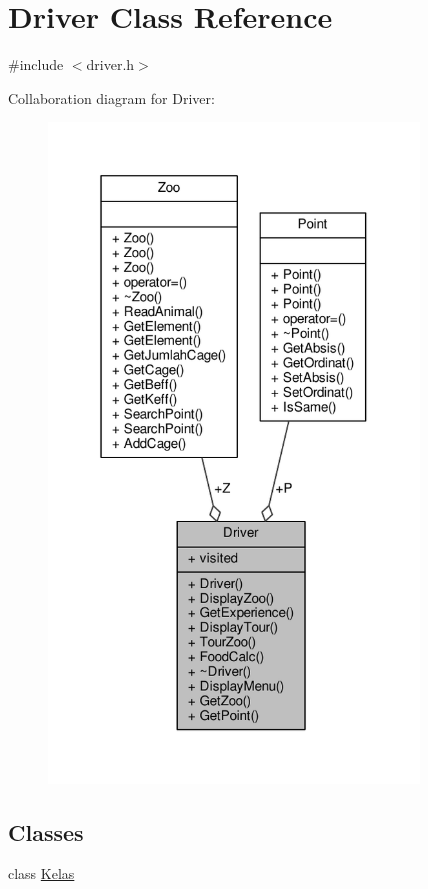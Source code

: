 \hypertarget{classDriver}{}\section{Driver Class Reference}
\label{classDriver}


{\ttfamily \#include $<$driver.\+h$>$}



Collaboration diagram for Driver\+:
\nopagebreak
\begin{figure}[H]
\begin{center}
\leavevmode
\includegraphics[width=279pt]{classDriver__coll__graph}
\end{center}
\end{figure}
\subsection*{Classes}
\begin{DoxyCompactItemize}
\item 
class \hyperlink{classDriver_1_1Kelas}{Kelas}
\end{DoxyCompactItemize}
